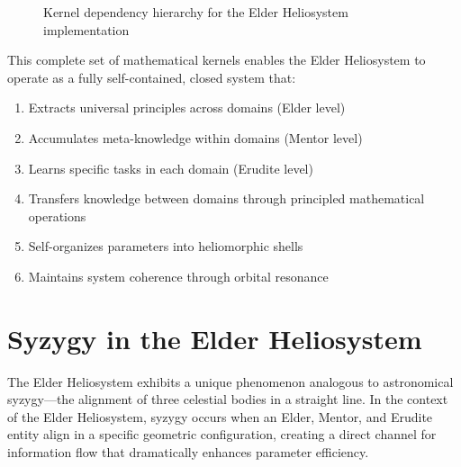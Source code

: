 \begin{figure}[h]
\caption{Kernel dependency hierarchy for the Elder Heliosystem implementation}
\label{fig:kernel_dependencies}
\end{figure}

This complete set of mathematical kernels enables the Elder Heliosystem to operate as a fully self-contained, closed system that:

\begin{enumerate}
    \item Extracts universal principles across domains (Elder level)
    \item Accumulates meta-knowledge within domains (Mentor level)
    \item Learns specific tasks in each domain (Erudite level)
    \item Transfers knowledge between domains through principled mathematical operations
    \item Self-organizes parameters into heliomorphic shells
    \item Maintains system coherence through orbital resonance
\end{enumerate}

\section{Syzygy in the Elder Heliosystem}

The Elder Heliosystem exhibits a unique phenomenon analogous to astronomical syzygy—the alignment of three celestial bodies in a straight line. In the context of the Elder Heliosystem, syzygy occurs when an Elder, Mentor, and Erudite entity align in a specific geometric configuration, creating a direct channel for information flow that dramatically enhances parameter efficiency.

